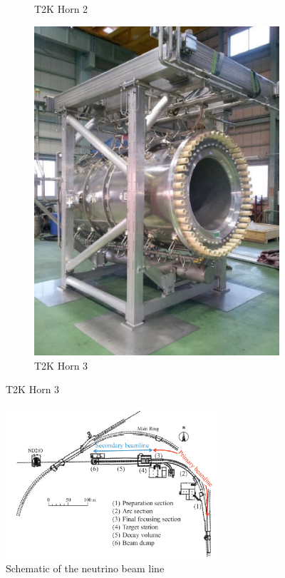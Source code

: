 \begin{figure}
\begin{subfigure}[b]{0.33\linewidth}
        \caption{T2K Horn 2} 
     \label{fig:horn2}
      \end{subfigure} 
      \begin{subfigure}[b]{0.33\linewidth}
        \includegraphics[width=\linewidth]{Figures/horn3.PNG}
         \caption{T2K Horn 3} 
      \label{fig:horn3}
       \end{subfigure} 
\end{figure}


\begin{figure}
    \centering
    \includegraphics[width=0.7\textwidth]{Figures/nubeamline.png}
    \caption{Schematic of the neutrino beam line}
        \label{fig:nubeamline}
\end{figure}

